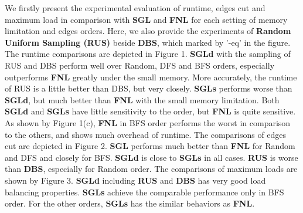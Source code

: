 \documentclass{sig-alternate-2013}
\begin{document}
 We firstly present the experimental evaluation of runtime, edges cut and maximum load in comparison with \textbf{SGL} and \textbf{FNL} for each setting of memory limitation and edges orders. Here, we also provide the experiments of \textbf{Random Uniform Sampling (RUS)} beside \textbf{DBS}, which marked by '-eq' in the figure.
The runtime comparisons are depicted in Figure 1. \textbf{SGLd} with the sampling of RUS and DBS perform well over Random, DFS and BFS orders, especially outperforms \textbf{FNL} greatly under the small memory. More accurately, the runtime of RUS is a little better than DBS, but very closely. \textbf{SGLs} performs worse than \textbf{SGLd}, but much better than \textbf{FNL} with the small memory limitation. Both \textbf{SGLd} and \textbf{SGLs} have little sensitivity to the order, but \textbf{FNL} is quite sensitive. As shown by Figure 1(c), \textbf{FNL} in BFS order performs the worst in comparison to the others, and shows much overhead of runtime.
The comparisons of edges cut are depicted in Figure 2. \textbf{SGL} performs much better than \textbf{FNL} for Random and DFS and closely for BFS. \textbf{SGLd} is close to \textbf{SGLs} in all cases. \textbf{RUS} is worse than \textbf{DBS}, especially for Random order.
The comparisons of maximum loads are shown by Figure 3. \textbf{SGLd} including \textbf{RUS} and \textbf{DBS} has very good load balancing properties. \textbf{SGLs} achieve the comparable performance only in BFS order. For the other orders, \textbf{SGLs} has the similar behaviors as \textbf{FNL}.
\end{document}
